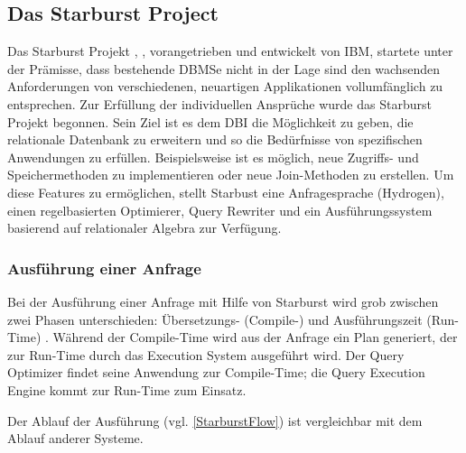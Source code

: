 \subsection{Das Starburst Project}

Das Starburst Projekt \cite{lohman1988Starbust}, \cite{haas1989extensible}, vorangetrieben und entwickelt von IBM,  startete unter der Prämisse, dass bestehende DBMSe nicht in der Lage sind den wachsenden Anforderungen von verschiedenen, neuartigen Applikationen vollumfänglich zu entsprechen. Zur Erfüllung der individuellen Ansprüche wurde das Starburst Projekt begonnen. Sein Ziel ist es dem \ac{DBI} die Möglichkeit zu geben, die relationale Datenbank zu erweitern und so die Bedürfnisse von spezifischen Anwendungen zu erfüllen. Beispielsweise ist es möglich, neue Zugriffs- und Speichermethoden zu implementieren oder neue Join-Methoden zu erstellen. Um diese Features zu ermöglichen, stellt Starbust eine Anfragesprache (Hydrogen), einen regelbasierten Optimierer, Query Rewriter und ein Ausführungssystem basierend auf relationaler Algebra zur Verfügung.


\subsubsection{Ausführung einer Anfrage}

Bei der Ausführung einer Anfrage mit Hilfe von Starburst wird grob zwischen zwei Phasen unterschieden: Übersetzungs- (Compile-) und Ausführungszeit (Run-Time) \cite{haas1989extensible}. Während der Compile-Time wird aus der Anfrage ein Plan generiert, der zur Run-Time durch das Execution System ausgeführt wird. Der Query Optimizer findet seine Anwendung zur Compile-Time; die Query Execution Engine kommt zur Run-Time zum Einsatz.

Der Ablauf der Ausführung (vgl. \ref{StarburstFlow}) ist vergleichbar mit dem Ablauf anderer Systeme.

